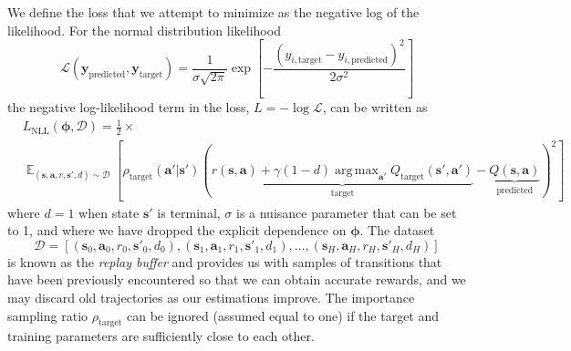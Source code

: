 \documentclass{article}
\DeclareMathOperator*{\argmax}{arg\,max}
\begin{document}
We define the loss that we attempt to minimize as the negative log of the likelihood. For the normal distribution likelihood
\begin{equation}
\mathcal{L}(\mathbf{y}_\text{predicted},\mathbf{y}_\text{target})=\frac{1}{\sigma\sqrt{2\pi}}\exp[-\frac{(y_{i,\text{target}}-y_{i,\text{predicted}})^2}{2\sigma^2}]
\end{equation}
the negative log-likelihood term in the loss, $L=-\log\mathcal{L}$, can be written as \begin{equation}\begin{split}\label{eq:likelihood_trajectory}&L_\text{NLL}(\boldsymbol{\phi},\mathcal{D})=\frac{1}{2}\times\\&\mathop{\mathbb{E}}_{(\mathbf{s},\mathbf{a},r,\mathbf{s}',d)\sim\mathcal{D}}\left[\rho_\text{target}(\mathbf{a}'|\mathbf{s}')\left(\underbrace{r(\mathbf{s},\mathbf{a})+\gamma(1-d)\argmax_{\mathbf{a}'}Q_{\text{target}}(\mathbf{s}',\mathbf{a}')}_\text{target}-\underbrace{Q(\mathbf{s},\mathbf{a})}_\text{predicted}\right)^2\right]\end{split}\end{equation}where $d=1$ when state $\mathbf{s}'$ is terminal,  $\sigma$ is a nuisance parameter that can be set to 1, and where we have dropped the explicit dependence on $\boldsymbol{\phi}$.  The dataset \begin{equation}\mathcal{D}=[(\mathbf{s}_0,\mathbf{a}_0,r_0,\mathbf{s}'_0,d_0),(\mathbf{s}_1,\mathbf{a}_1,r_1,\mathbf{s}'_1,d_1),\dots,(\mathbf{s}_H,\mathbf{a}_H,r_H,\mathbf{s}'_H,d_H)]\end{equation}is known as the \textit{replay buffer} and provides us with samples of transitions that have been previously encountered so that we can obtain accurate rewards, and we may discard old trajectories as our estimations improve. The importance sampling ratio $\rho_\text{target}$ can be ignored (assumed equal to one) if the target and training parameters are sufficiently close to each other.
\end{document}
